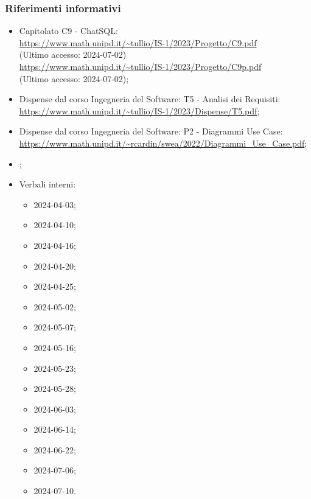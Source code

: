 \subsubsection{Riferimenti informativi}
\begin{itemize}
  \item Capitolato C9 - ChatSQL:\\ \href{https://www.math.unipd.it/~tullio/IS-1/2023/Progetto/C9.pdf}{https://www.math.unipd.it/\textasciitilde tullio/IS-1/2023/Progetto/C9.pdf} \\ (Ultimo accesso: 2024-07-02) \\ \href{https://www.math.unipd.it/~tullio/IS-1/2023/Progetto/C9.pdf}{https://www.math.unipd.it/\textasciitilde tullio/IS-1/2023/Progetto/C9p.pdf} \\ (Ultimo accesso: 2024-07-02);
  \item Dispense dal corso Ingegneria del Software: T5 - Analisi dei Requisiti:\\ \href{https://www.math.unipd.it/~tullio/IS-1/2023/Dispense/T5.pdf}{https://www.math.unipd.it/\textasciitilde tullio/IS-1/2023/Dispense/T5.pdf};
  \item Dispense dal corso Ingegneria del Software: P2 - Diagrammi Use Case:\\ \href{https://www.math.unipd.it/~rcardin/swea/2022/Diagrammi%20Use%20Case.pdf}{https://www.math.unipd.it/\textasciitilde rcardin/swea/2022/Diagrammi\_Use\_Case.pdf};
  \item \Glossario;
  \item Verbali interni:
  \begin{itemize}
    \item 2024-04-03;
    \item 2024-04-10;
    \item 2024-04-16;
    \item 2024-04-20;
    \item 2024-04-25;
    \item 2024-05-02;
    \item 2024-05-07;
    \item 2024-05-16;
    \item 2024-05-23;
    \item 2024-05-28;
    \item 2024-06-03;
    \item 2024-06-14;
    \item 2024-06-22;
    \item 2024-07-06;
    \item 2024-07-10.
  \end{itemize}

\end{itemize}

